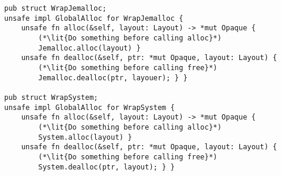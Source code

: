 \begin{lstlisting}[caption=Custom allocators wrapping jemalloc and the system allocator]
pub struct WrapJemalloc;
unsafe impl GlobalAlloc for WrapJemalloc {
    unsafe fn alloc(&self, layout: Layout) -> *mut Opaque {
        (*\lit{Do something before calling alloc}*)
        Jemalloc.alloc(layout) }
    unsafe fn dealloc(&self, ptr: *mut Opaque, layout: Layout) {
        (*\lit{Do something before calling free}*)
        Jemalloc.dealloc(ptr, layouer); } }

pub struct WrapSystem;
unsafe impl GlobalAlloc for WrapSystem {
    unsafe fn alloc(&self, layout: Layout) -> *mut Opaque {
        (*\lit{Do something before calling alloc}*)
        System.alloc(layout) }
    unsafe fn dealloc(&self, ptr: *mut Opaque, layout: Layout) {
        (*\lit{Do something before calling free}*)
        System.dealloc(ptr, layout); } }
\end{lstlisting}
